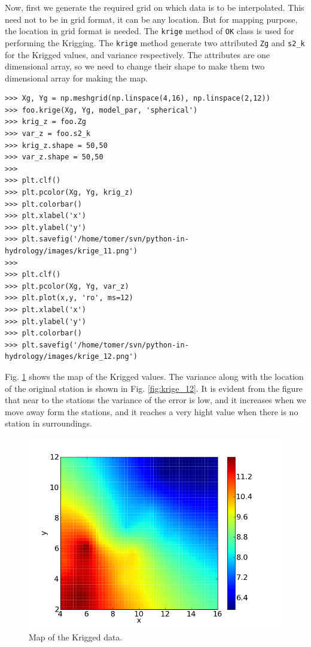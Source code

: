 \documentclass[10pt]{book}
\begin{document}
Now, first we generate the required grid on which data is to be interpolated. This need not to be in grid format, it can be any location. But for mapping purpose, the location in grid format is needed. The \verb"krige" method of \verb"OK" class is used for performing the Krigging. The \verb"krige" method generate two attributed \verb"Zg" and \verb"s2_k" for the Krigged values, and variance respectively. The attributes are one dimensional array, so we need to change their shape to make them two dimensional array for making the map. 
\beforeverb \begin{verbatim}
>>> Xg, Yg = np.meshgrid(np.linspace(4,16), np.linspace(2,12))
>>> foo.krige(Xg, Yg, model_par, 'spherical')
>>> krig_z = foo.Zg
>>> var_z = foo.s2_k
>>> krig_z.shape = 50,50
>>> var_z.shape = 50,50
>>> 
>>> plt.clf()
>>> plt.pcolor(Xg, Yg, krig_z)
>>> plt.colorbar()
>>> plt.xlabel('x')
>>> plt.ylabel('y')
>>> plt.savefig('/home/tomer/svn/python-in-hydrology/images/krige_11.png')
>>> 
>>> plt.clf()
>>> plt.pcolor(Xg, Yg, var_z)
>>> plt.plot(x,y, 'ro', ms=12)
>>> plt.xlabel('x')
>>> plt.ylabel('y')
>>> plt.colorbar()
>>> plt.savefig('/home/tomer/svn/python-in-hydrology/images/krige_12.png')
\end{verbatim} \afterverb

Fig. \ref{fig:krige_11} shows the map of the Krigged values. The variance along with the location of the original station is shown in Fig. \ref{fig:krige_12}. It is evident from the figure that near to the stations the variance of the error is low, and it increases when we move away form the stations, and it reaches a very hight value when there is no station in surroundings. 


\beforefig
\begin{figure}[h!]
  \centering
    \includegraphics[scale=0.5]{images/krige_11.png}
  \caption{Map of the Krigged data.}
   \label{fig:krige_11}
\end{figure}
\afterfig
\end{document}
